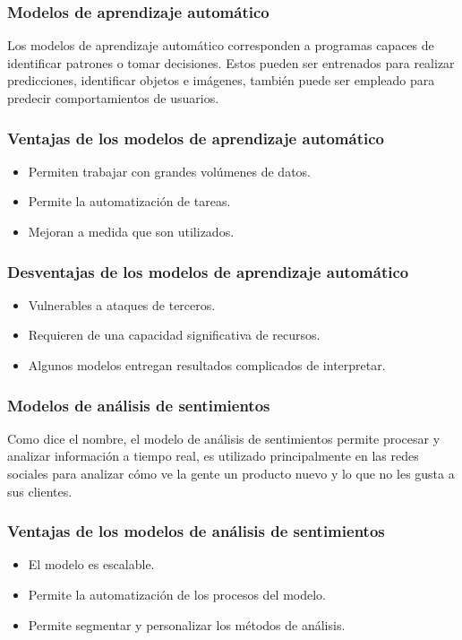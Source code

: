 \subsubsection{Modelos de aprendizaje automático}
Los modelos de aprendizaje automático corresponden a programas capaces de identificar patrones o tomar decisiones. Estos pueden ser entrenados para realizar predicciones, identificar objetos e imágenes, también puede ser empleado para predecir comportamientos de usuarios.

\subsubsection{Ventajas de los modelos de aprendizaje automático}
\begin{itemize}
    \item Permiten trabajar con grandes volúmenes de datos.
    \item Permite la automatización de tareas.
    \item Mejoran a medida que son utilizados.
\end{itemize}

\subsubsection{Desventajas de los modelos de aprendizaje automático}
\begin{itemize}
    \item Vulnerables a ataques de terceros.
    \item Requieren de una capacidad significativa de recursos.
    \item Algunos modelos entregan resultados complicados de interpretar.
\end{itemize}

\subsubsection{Modelos de análisis de sentimientos}
Como dice el nombre, el modelo de análisis de sentimientos permite procesar y analizar información a tiempo real, es utilizado principalmente en las redes sociales para analizar cómo ve la gente un producto nuevo y lo que no les gusta a sus clientes.

\subsubsection{Ventajas de los modelos de análisis de sentimientos}
\begin{itemize}
    \item El modelo es escalable.
    \item Permite la automatización de los procesos del modelo.
    \item Permite segmentar y personalizar los métodos de análisis.
\end{itemize}

